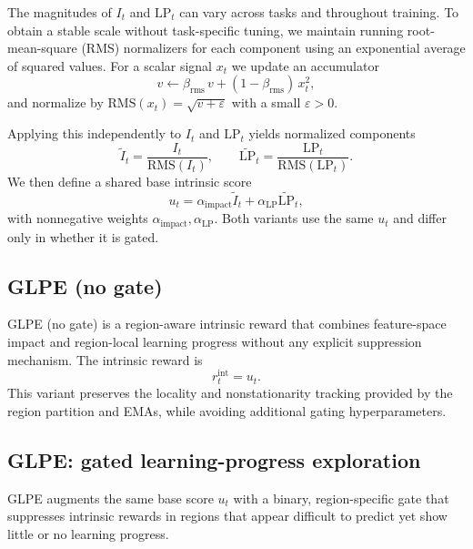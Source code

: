 The magnitudes of $I_t$ and $\mathrm{LP}_t$ can vary across tasks and throughout training.
To obtain a stable scale without task-specific tuning, we maintain running root-mean-square (RMS) normalizers for each component using an exponential average of squared values.
For a scalar signal $x_t$ we update an accumulator
\begin{equation}
    v \leftarrow \beta_{\mathrm{rms}}\,v + (1-\beta_{\mathrm{rms}})\,x_t^2,
\end{equation}
and normalize by $\mathrm{RMS}(x_t)=\sqrt{v+\varepsilon}$ with a small $\varepsilon>0$.

Applying this independently to $I_t$ and $\mathrm{LP}_t$ yields normalized components
\begin{equation}
    \widetilde{I}_t = \frac{I_t}{\mathrm{RMS}(I_t)},\qquad
    \widetilde{\mathrm{LP}}_t = \frac{\mathrm{LP}_t}{\mathrm{RMS}(\mathrm{LP}_t)}.
\end{equation}
We then define a shared base intrinsic score
\begin{equation}
    u_t = \alpha_{\mathrm{impact}}\widetilde{I}_t + \alpha_{\mathrm{LP}}\widetilde{\mathrm{LP}}_t,
\end{equation}
with nonnegative weights $\alpha_{\mathrm{impact}},\alpha_{\mathrm{LP}}$.
Both variants use the same $u_t$ and differ only in whether it is gated.

\subsection{GLPE (no gate)}

GLPE (no gate) is a region-aware intrinsic reward that combines feature-space impact and region-local learning progress without any explicit suppression mechanism.
The intrinsic reward is
\begin{equation}
    r_t^{\mathrm{int}} = u_t.
\end{equation}
This variant preserves the locality and nonstationarity tracking provided by the region partition and EMAs, while avoiding additional gating hyperparameters.

\subsection{GLPE: gated learning-progress exploration}

GLPE augments the same base score $u_t$ with a binary, region-specific gate that suppresses intrinsic rewards in regions that appear difficult to predict yet show little or no learning progress.

